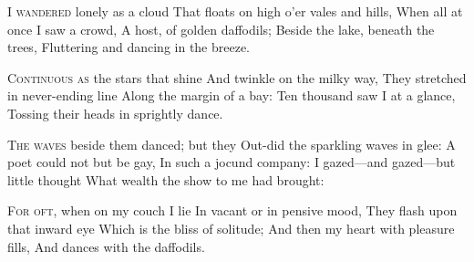 \documentclass[fontsize=9, a5paper]{scrbook}
\newcommand\blankpage{%
    \null
    \thispagestyle{empty}%
    \addtocounter{page}{-1}%
    \newpage}
\begin{document}
\afterpage{\blankpage}
\begin{poem}
	\begin{stanza}
		\textsc{I wandered} lonely as a cloud\verseline
		That floats on high o'er vales and hills,\verseline
		When all at once I saw a crowd,\verseline
		A host, of golden daffodils;\verseline
		Beside the lake, beneath the trees,\verseline
		Fluttering and dancing in the breeze.
	\end{stanza}
	
	\begin{stanza}
		\textsc{Continuous as} the stars that shine\verseline
		And twinkle on the milky way,\verseline
		They stretched in never-ending line\verseline
		Along the margin of a bay:\verseline
		Ten thousand saw I at a glance,\verseline
		Tossing their heads in sprightly dance.
	\end{stanza}
	
	\begin{stanza}
		\textsc{The waves} beside them danced; but they\verseline
		Out-did the sparkling waves in glee:\verseline
		A poet could not but be gay,\verseline
		In such a jocund company:\verseline
		I gazed—and gazed—but little thought\verseline
		What wealth the show to me had brought:
	\end{stanza}
	
	\begin{stanza}
		\textsc{For oft,} when on my couch I lie\verseline
		In vacant or in pensive mood,\verseline
		They flash upon that inward eye\verseline
		Which is the bliss of solitude;\verseline
		And then my heart with pleasure fills,\verseline
		And dances with the daffodils.
	\end{stanza}
\end{poem}

\pagebreak
\end{document}
